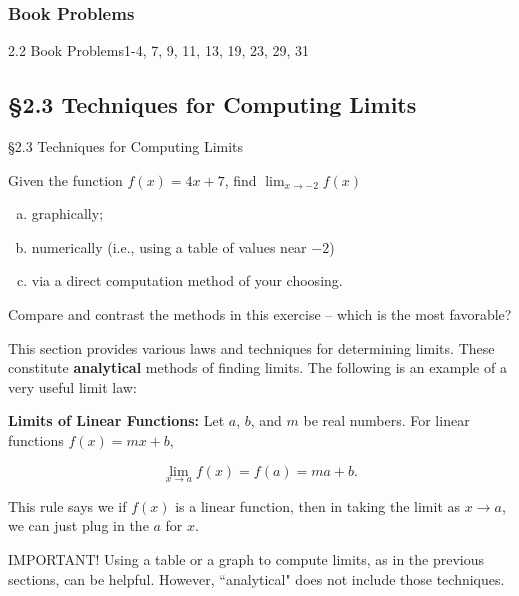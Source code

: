 \documentclass[cal1spr16Lectures.tex]{subfiles}
\begin{document}
\subsubsection{Book Problems}
\begin{frame}
\begin{block}{2.2 Book Problems}1-4, 7, 9, 11, 13, 19, 23, 29, 31 \end{block} 
\end{frame}

\subsection[2.3 Techniques for Computing Limits]{\S 2.3 Techniques for Computing Limits}

\begin{frame}{\S 2.3 Techniques for Computing Limits}\footnotesize
\begin{exe}
Given the function $f(x)=4x+7$, find $\lim_{x\to -2}f(x)$
\begin{enumerate}[(a)]
	\item graphically;
	\item numerically (i.e., using a table of values near $-2$)
	\item via a direct computation method of your choosing.
	\end{enumerate}
\end{exe}

Compare and contrast the methods in this exercise -- which is the most favorable?
\end{frame}

\begin{frame}{}\footnotesize
This section provides various laws and techniques for determining limits.  These constitute {\bf analytical} methods of finding limits.  The following is an example of a very useful limit law:

\vspace{0.5pc}
{\bf Limits of Linear Functions:}  Let $a$, $b$, and $m$ be real numbers.  For linear functions $f(x)=mx+b$,

\vspace{-0.5pc}
\[\lim_{x \to a} f(x)=f(a)=ma+b.\]

\vspace{0.25pc}
This rule says we if $f(x)$ is a linear function, then in taking the limit as $x\to a$, we can just plug in the $a$ for $x$.

\vspace{0.5pc}
\alert{IMPORTANT!} Using a table or a graph to compute limits, as in the previous sections, can be helpful.  However, ``analytical" does not include those techniques.
\end{frame}
\end{document}

